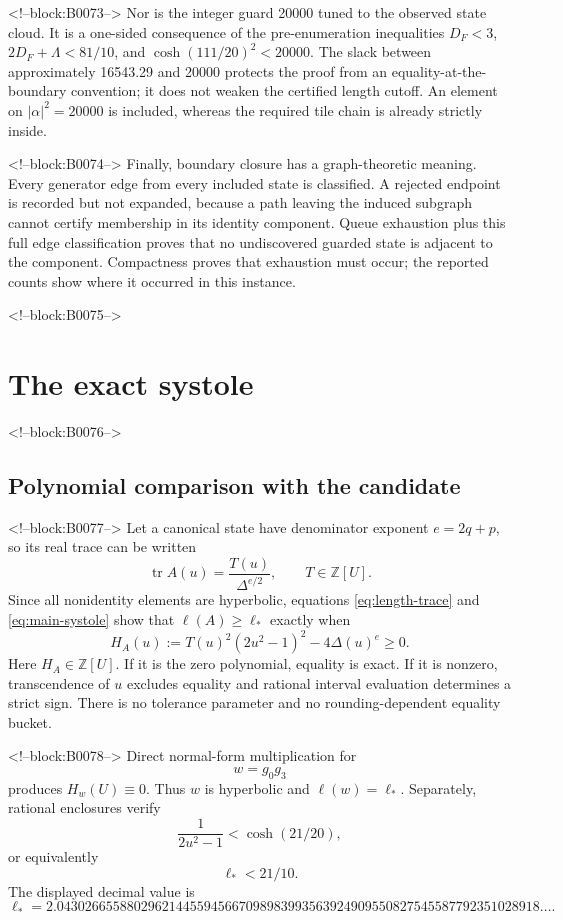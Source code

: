 \documentclass[11pt,a4paper]{article}
\theoremstyle{definition}
\newcommand{\Z}{\mathbb Z}
\newcommand{\tr}{\operatorname{tr}}
\newcommand{\length}{\ell}
\begin{document}
<!--block:B0073-->
Nor is the integer guard 20000 tuned to the observed state cloud.  It is a
one-sided consequence of the pre-enumeration inequalities
\(D_F<3\), \(2D_F+\Lambda<81/10\), and
\(\cosh(111/20)^2<20000\).  The slack between approximately 16543.29 and
20000 protects the proof from an equality-at-the-boundary convention; it does
not weaken the certified length cutoff.  An element on
\(|\alpha|^2=20000\) is included, whereas the required tile chain is already
strictly inside.

<!--block:B0074-->
Finally, boundary closure has a graph-theoretic meaning.  Every generator edge
from every included state is classified.  A rejected endpoint is recorded but
not expanded, because a path leaving the induced subgraph cannot certify
membership in its identity component.  Queue exhaustion plus this full edge
classification proves that no undiscovered guarded state is adjacent to the
component.  Compactness proves that exhaustion must occur; the reported counts
show where it occurred in this instance.

<!--block:B0075-->
\section{The exact systole}
\label{sec:systole}

<!--block:B0076-->
\subsection{Polynomial comparison with the candidate}

<!--block:B0077-->
Let a canonical state have denominator exponent \(e=2q+p\), so its real
trace can be written
\[
 \tr A(u)=\frac{T(u)}{\Delta^{e/2}},\qquad T\in\Z[U].
\]
Since all nonidentity elements are hyperbolic, equations
\eqref{eq:length-trace} and \eqref{eq:main-systole} show that
\(\length(A)\geq\length_*\) exactly when
\begin{equation}\label{eq:H}
 H_A(u):=T(u)^2(2u^2-1)^2-4\Delta(u)^e\geq0.
\end{equation}
Here \(H_A\in\Z[U]\).  If it is the zero polynomial, equality is exact.  If it
is nonzero, transcendence of \(u\) excludes equality and rational interval
evaluation determines a strict sign.  There is no tolerance parameter and no
rounding-dependent equality bucket.

<!--block:B0078-->
Direct normal-form multiplication for
\begin{equation}\label{eq:witness}
 w=g_0g_3
\end{equation}
produces \(H_w(U)\equiv0\).  Thus \(w\) is hyperbolic and
\(\length(w)=\length_*\).  Separately, rational enclosures verify
\[
 \frac{1}{2u^2-1}<\cosh(21/20),
\]
or equivalently
\begin{equation}\label{eq:candidate-cutoff}
 \length_*<21/10.
\end{equation}
The displayed decimal value is
\[
 \length_*=2.043026655880296214455945667098983993563924909550827545587792351028918\ldots.
\]
\end{document}
